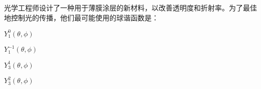 \documentclass{njustexam}
\begin{document}
  
  
  

  \begin{problem}
    光学工程师设计了一种用于薄膜涂层的新材料，以改善透明度和折射率。为了最佳地控制光的传播，他们最可能使用的球谐函数是：
    \begin{abcd}

    \item $Y_{1}^0(\theta, \phi)$
    
    \item $Y_{1}^{-1}(\theta, \phi)$
    
    \item $Y_{3}^1(\theta, \phi)$
    
    \item $Y_{3}^2(\theta, \phi)$
   \end{abcd}

  \end{problem}





\end{document}
